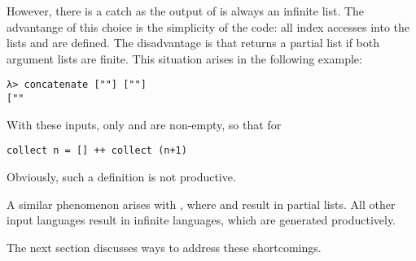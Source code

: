 However, there is a catch as the output of  is always
an infinite list. The advantange of this choice is the simplicity of
the code: all index accesses into the lists  and
 are defined. The disadvantage is
that  returns a partial list if both argument lists
are finite.
This situation arises in the following example:
\begin{verbatim}
λ> concatenate [""] [""]
[""
\end{verbatim}
With these inputs, only  and  are
non-empty, so that for
\begin{lstlisting}[numbers=none]
collect n = [] ++ collect (n+1)
\end{lstlisting}
Obviously, such a definition is not productive.

A similar phenomenon arises with , where  and
 result in partial lists. All other input languages
result in infinite languages, which are generated productively.

The next section discusses ways to address these shortcomings.


